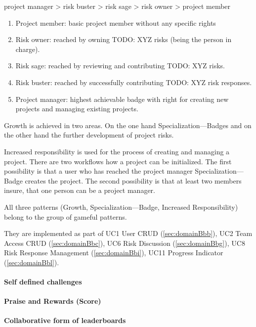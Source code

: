 project manager > risk buster > risk sage > risk owner > project member

\begin{enumerate}
	\item Project member: basic project member without any specific rights
	\item Risk owner: reached by owning TODO: XYZ risks (being the person in charge).
	\item Risk sage: reached by reviewing and contributing TODO: XYZ risks.
	\item Risk buster: reached by successfully contributing TODO: XYZ risk responses.
	\item Project manager: highest achievable badge with right for creating new projects and managing existing projects.
\end{enumerate}

Growth is achieved in two areas. On the one hand Specialization—Badges and on the other hand the further development of project risks.

Increased responsibility is used for the process of creating and managing a project. There are two workflows how a project can be initialized. The first possibility is that a user who has reached the project manager Specialization—Badge creates the project. The second possibility is that at least two members insure, that one person can be a project manager.

All three patterns (Growth, Specialization—Badge, Increased Responsibility) belong to the group of gameful patterns.

They are implemented as part of \ac{UC}1 User CRUD (\ref{sec:domainBbb}), \ac{UC}2 Team Access CRUD (\ref{sec:domainBbc}), \ac{UC}6 Risk Discussion (\ref{sec:domainBbg}), \ac{UC}8 Risk Response Management (\ref{sec:domainBbi}), \ac{UC}11 Progress Indicator (\ref{sec:domainBbl}).

\paragraph*{Self defined challenges}

\paragraph*{Praise and Rewards (Score)}

\paragraph*{Collaborative form of leaderboards}


